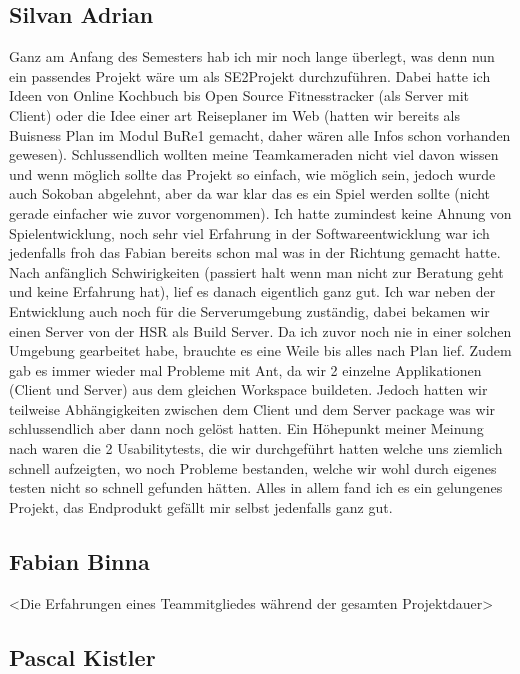 \documentclass[11pt]{scrartcl}
\begin{document}
\subsection{Silvan Adrian}
Ganz am Anfang des Semesters hab ich mir noch lange überlegt, was denn nun ein
passendes Projekt wäre um als SE2Projekt durchzuführen.
Dabei hatte ich Ideen von Online Kochbuch bis Open Source Fitnesstracker 
(als Server mit Client) oder die Idee einer art Reiseplaner im Web (hatten wir 
bereits als Buisness Plan im Modul BuRe1 gemacht, daher wären 
alle Infos schon vorhanden gewesen).
Schlussendlich wollten meine Teamkameraden nicht viel davon wissen und
wenn möglich sollte das Projekt so einfach, wie möglich sein, jedoch wurde auch 
Sokoban abgelehnt, aber da war klar das es ein Spiel werden sollte 
(nicht gerade einfacher wie zuvor vorgenommen).
Ich hatte zumindest keine Ahnung von Spielentwicklung, noch sehr viel Erfahrung in 
der Softwareentwicklung war ich jedenfalls froh das Fabian bereits schon mal was in
der Richtung gemacht hatte.
Nach anfänglich Schwirigkeiten (passiert halt wenn man nicht zur 
Beratung geht und keine Erfahrung hat), lief es danach eigentlich ganz gut.
Ich war neben der Entwicklung auch noch für die Serverumgebung zuständig, dabei
bekamen wir einen Server von der HSR als Build Server.
Da ich zuvor noch nie in einer solchen Umgebung gearbeitet habe, brauchte es 
eine Weile bis alles nach Plan lief.
Zudem gab es immer wieder mal Probleme mit Ant, da wir 2 einzelne Applikationen
(Client und Server) aus dem gleichen Workspace buildeten. 
Jedoch hatten wir teilweise Abhängigkeiten zwischen dem Client und dem Server 
package was wir schlussendlich aber dann noch gelöst hatten.
Ein Höhepunkt meiner Meinung nach waren die 2 Usabilitytests, die 
wir durchgeführt hatten welche uns ziemlich schnell aufzeigten, wo noch Probleme
bestanden, welche wir wohl durch eigenes testen nicht so schnell gefunden 
hätten.
Alles in allem fand ich es ein gelungenes Projekt, das Endprodukt gefällt mir 
selbst jedenfalls ganz gut.
\newpage
\subsection{Fabian Binna}
<Die Erfahrungen eines Teammitgliedes während der gesamten Projektdauer>
\newpage
\subsection{Pascal Kistler}
\end{document}

